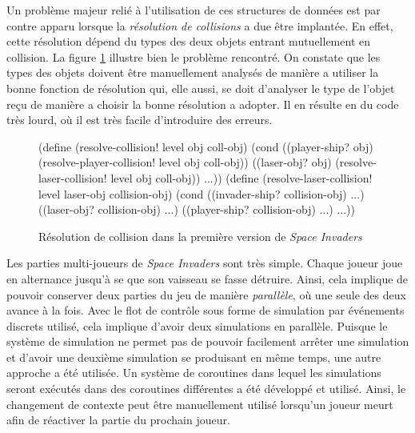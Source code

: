 \documentclass[12pt,oneside,letterpaper,francais]{book}
\newcommand{\si}{{\textit{Space Invaders }}}
\begin{document}
Un problème majeur relié à l'utilisation de ces structures de données
est par contre apparu lorsque la \emph{résolution de collisions} a due
être implantée. En effet, cette résolution dépend du types des deux
objets entrant mutuellement en collision. La figure
\ref{Exp:si1-col-res} illustre bien le problème rencontré. On constate
que les types des objets doivent être manuellement analysés de manière
a utiliser la bonne fonction de résolution qui, elle aussi, se doit
d'analyser le type de l'objet reçu de manière a choisir la bonne
résolution a adopter. Il en résulte en du code très lourd, où il est
très facile d'introduire des erreurs.

\begin{figure}[htb!]
  \begin{schemecode}
(define (resolve-collision! level obj coll-obj)
  (cond
   ((player-ship? obj) (resolve-player-collision! level obj coll-obj))
   ((laser-obj? obj) (resolve-laser-collision! level obj coll-obj))
   ...))
(define (resolve-laser-collision! level laser-obj collision-obj)
  (cond ((invader-ship? collision-obj) ...)
        ((laser-obj? collision-obj) ...)
        ((player-ship? collision-obj) ...)
        ...))
  \end{schemecode}
  \caption{Résolution de collision dans la première version de \si}
  \label{Exp:si1-col-res}
\end{figure}

Les parties multi-joueurs de \si sont très simple. Chaque joueur joue
en alternance jusqu'à se que son vaisseau se fasse détruire. Ainsi,
cela implique de pouvoir conserver deux parties du jeu de manière
\emph{parallèle}, où une seule des deux avance à la fois. Avec le flot
de contrôle sous forme de simulation par événements discrets utilisé,
cela implique d'avoir deux simulations en parallèle. Puisque le
système de simulation ne permet pas de pouvoir facilement arrêter une
simulation et d'avoir une deuxième simulation se produisant en même
temps, une autre approche a été utilisée. Un système de coroutines
dans lequel les simulations seront exécutés dans des coroutines
différentes a été développé et utilisé. Ainsi, le changement de
contexte peut être manuellement utilisé lorsqu'un joueur meurt afin de
réactiver la partie du prochain joueur.
\end{document}

